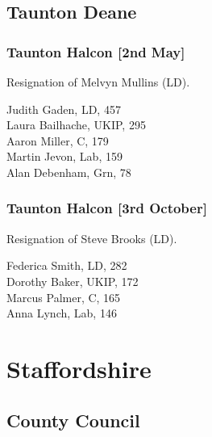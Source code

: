 \documentclass[a4paper,openany,10pt]{book}
\begin{document}
\subsection*{Taunton Deane}

\subsubsection*{Taunton Halcon \hspace*{\fill}\nolinebreak[1]%
\enspace\hspace*{\fill}
[2nd May]}


Resignation of Melvyn Mullins (LD).



Judith Gaden, LD, 457\\
Laura Bailhache, UKIP, 295\\
Aaron Miller, C, 179\\
Martin Jevon, Lab, 159\\
Alan Debenham, Grn, 78\\


\subsubsection*{Taunton Halcon \hspace*{\fill}\nolinebreak[1]%
\enspace\hspace*{\fill}
[3rd October]}


Resignation of Steve Brooks (LD).



Federica Smith, LD, 282\\
Dorothy Baker, UKIP, 172\\
Marcus Palmer, C, 165\\
Anna Lynch, Lab, 146\\


\section{Staffordshire}

\subsection*{County Council}
\end{document}
